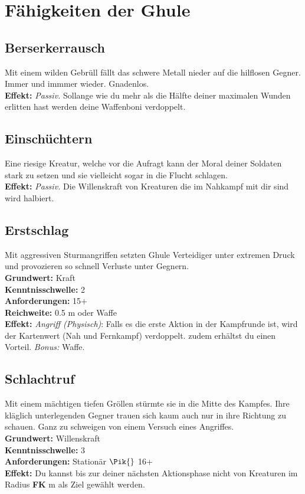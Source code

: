 

\section{Fähigkeiten der Ghule} \label{ghulskills}

\subsection*{Berserkerrausch} \label{sk:berserkerrausch}
Mit einem wilden Gebrüll fällt das schwere Metall nieder auf die hilflosen Gegner. Immer und immmer wieder. Gnadenlos.\\
\textbf{Effekt:} \textit{Passiv.} Sollange wie du mehr als die Hälfte deiner maximalen Wunden erlitten hast werden deine Waffenboni verdoppelt.

\subsection*{Einschüchtern}
Eine riesige Kreatur, welche vor die Aufragt kann der Moral deiner Soldaten stark zu setzen und sie vielleicht sogar in die Flucht schlagen.\\
\textbf{Effekt:} \textit{Passiv.} Die Willenskraft von Kreaturen die im Nahkampf mit dir sind wird halbiert.

\subsection*{Erstschlag} \label{sk:erstschlag}
Mit aggressiven Sturmangriffen setzten Ghule Verteidiger unter extremen Druck und provozieren so schnell Verluste unter Gegnern. \\
\textbf{Grundwert:} Kraft \\
\textbf{Kenntnisschwelle:} 2 \\
\textbf{Anforderungen:} 15+ \\
\textbf{Reichweite:} 0.5 m oder Waffe  \\
\textbf{Effekt:} \textit{Angriff (Physisch)}: Falls es die erste Aktion in der Kampfrunde ist, wird der Kartenwert (Nah und Fernkampf) verdoppelt. zudem erhältst du einen Vorteil. \textit{Bonus:} Waffe.

\subsection*{Schlachtruf} \label{sk:schlachtruf}
Mit einem mächtigen tiefen Gröllen stürmte sie in die Mitte des Kampfes. Ihre kläglich unterlegenden Gegner trauen sich kaum auch nur in ihre Richtung zu schauen. Ganz zu schweigen von einem Versuch eines Angriffes. \\
\textbf{Grundwert:} Willenskraft \\
\textbf{Kenntnisschwelle:} 3 \\
\textbf{Anforderungen:} Stationär $\Pik{}$ 16+ \\
\textbf{Effekt:}  Du kannst bis zur deiner nächsten Aktionsphase nicht von Kreaturen im Radius \textbf{FK} m als Ziel gewählt werden.

